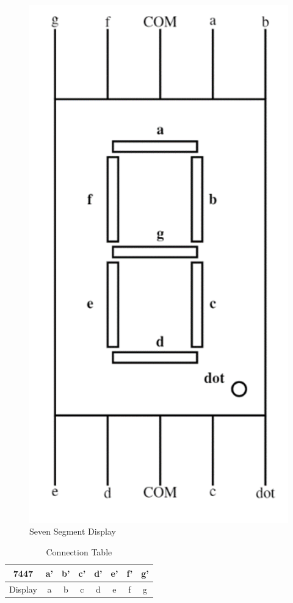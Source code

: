 \documentclass[journal,12pt,twocolumn]{IEEEtran}
\begin{document}
\begin{figure}[h!]
\centering
\includegraphics[scale=1]{display.png}
\centering
\caption{Seven Segment Display}
\end{figure}


\begin{table}[h]
\Large
\centering
\begin{tabular}{|c|c|c|c|c|c|c|c|}
\hline
7447 & a' & b' & c' & d' & e' & f' & g'\\
\hline
Display & a & b & c & d & e & f & g\\
\hline
\end{tabular}
\caption{Connection Table}
\label{table:1}
\end{table}
\end{document}
